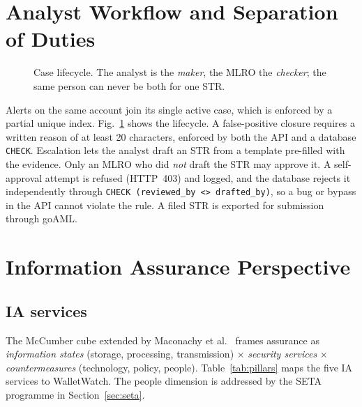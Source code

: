 \documentclass[conference,10pt]{IEEEtran}
\newcommand{\code}[1]{\texttt{\small #1}}
\begin{document}
\section{Analyst Workflow and Separation of Duties}

\begin{figure}[t]
  \centering
  \resizebox{\columnwidth}{!}{}
  \caption{Case lifecycle. The analyst is the \emph{maker}, the MLRO the \emph{checker}; the same
  person can never be both for one STR.}
  \label{fig:workflow}
\end{figure}

Alerts on the same account join its single active case, which is enforced by a partial unique
index. Fig.~\ref{fig:workflow} shows the lifecycle. A false-positive closure requires a written
reason of at least 20 characters, enforced by both the API and a database \code{CHECK}. Escalation
lets the analyst draft an STR from a template pre-filled with the evidence. Only an MLRO who did
\emph{not} draft the STR may approve it. A self-approval attempt is refused (HTTP~403) and logged,
and the database rejects it independently through \code{CHECK (reviewed\_by <> drafted\_by)}, so a
bug or bypass in the API cannot violate the rule. A filed STR is exported for submission through
goAML.

\section{Information Assurance Perspective}\label{sec:ia}

\subsection{IA services}
The McCumber cube extended by Maconachy et al.~\cite{maconachy2001msr} frames assurance as
\emph{information states} (storage, processing, transmission) $\times$ \emph{security services}
$\times$ \emph{countermeasures} (technology, policy, people). Table~\ref{tab:pillars} maps the five
IA services to WalletWatch. The people dimension is addressed by the SETA programme in
Section~\ref{sec:seta}.
\end{document}

